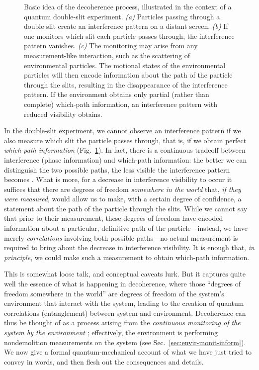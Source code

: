\documentclass[3p,sort&compress]{elsarticle}
\begin{document}
\begin{figure}
\caption{\label{fig:bi}Basic idea of the decoherence process, illustrated in the context of a quantum double-slit experiment. \emph{(a)} Particles passing through a double slit create an interference pattern on a distant screen. \emph{(b)} If one monitors which slit each particle passes through, the interference pattern vanishes. \emph{(c)} The monitoring may arise from any measurement-like interaction, such as the scattering of environmental particles. The motional states of the environmental particles will then encode information about the path of the particle through the slits, resulting in the disappearance of the interference pattern. If the environment obtains only partial (rather than complete) which-path information, an interference pattern with reduced visibility obtains.}
\end{figure}

In the double-slit experiment, we cannot observe an interference pattern if we also measure which slit the particle passes through, that is, if we obtain perfect \emph{which-path information} (Fig.~\ref{fig:bi}). In fact, there is a continuous tradeoff between interference (phase information) and which-path information: the better we can distinguish the two possible paths, the less visible the interference pattern becomes \cite{Wooters:1979:az,Englert:1996:km}. What is more, for a decrease in interference visibility to occur it suffices that there are degrees of freedom \emph{somewhere in the world} that, \emph{if they were measured}, would allow us to make, with a certain degree of confidence, a statement about the path of the particle through the slits. While we cannot say that prior to their measurement, these degrees of freedom have encoded information about a particular, definitive path of the particle---instead, we have merely \emph{correlations} involving both possible paths---no actual measurement is required to bring about the decrease in interference visibility. It is enough that, \emph{in principle}, we could make such a measurement to obtain which-path information. 

This is somewhat loose talk, and conceptual caveats lurk. But it captures quite well the essence of what is happening in decoherence, where those ``degrees of freedom somewhere in the world'' are degrees of freedom of the system's environment that interact with the system, leading to the creation of quantum correlations (entanglement) between system and environment. Decoherence can thus be thought of as a process arising from the \emph{continuous monitoring of the system by the environment} \cite{Zurek:1981:dd}; effectively, the environment is performing nondemolition measurements on the system (see Sec.~\ref{sec:envir-monit-inform}). We now give a formal quantum-mechanical account of what we have just tried to convey in words, and then flesh out the consequences and details.
\end{document}
